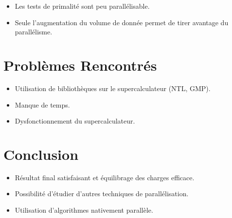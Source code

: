 \begin{frame}
\begin{itemize}
\item Les tests de primalité sont peu parallélisable. \vspace{2em}
\item Seule l'augmentation du volume de donnée permet de tirer avantage du parallélisme. \vspace{2em}
\end{itemize}
\end{frame}
	
	\section{Problèmes Rencontrés}
	\begin{frame}
\begin{itemize}
\item Utilisation de bibliothèques sur le supercalculateur (NTL, GMP).\vspace{1.5em}
\item Manque de temps. \vspace{1.5em}
\item Dysfonctionnement  du supercalculateur.
\end{itemize}
	\end{frame}
	
	\section{Conclusion}
	\begin{frame}
	\begin{itemize}
\item Résultat final satisfaisant et équilibrage des charges efficace.\vspace{1.5em}
\item Possibilité d’étudier d’autres techniques de parallélisation.\vspace{1.5em}
\item Utilisation d’algorithmes nativement parallèle.
\end{itemize}
	\end{frame}


